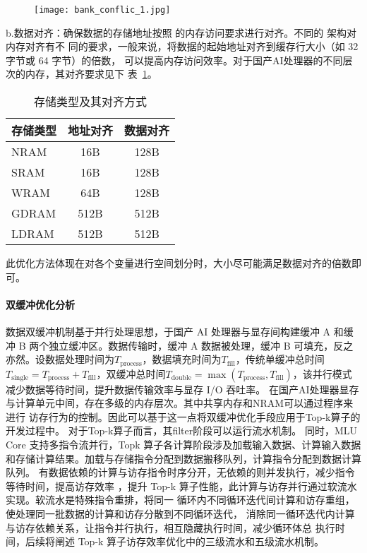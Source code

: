 \begin{figure}[ht]
    \centering
 \texttt{[image: bank\_conflic\_1.jpg]}
    \caption{}
    \label{fig:bank_conflic}
\end{figure}





b.数据对齐：确保数据的存储地址按照 的内存访问要求进行对齐。不同的 架构对内存对齐有不
同的要求，一般来说，将数据的起始地址对齐到缓存行大小（如 32 字节或 64 字节）的倍数，
可以提高内存访问效率。对于国产AI处理器的不同层次的内存，其对齐要求见下
表~\ref{tab:alignment}。

\begin{table}
    \centering
    \begin{tabular}{lcc}
    \toprule
    存储类型 & 地址对齐 & 数据对齐 \\
    \midrule
    NRAM & 16B & 128B \\
    SRAM & 16B & 128B \\
    WRAM & 64B & 128B \\
    GDRAM & 512B & 512B \\
    LDRAM & 512B & 512B \\
    \bottomrule
    \end{tabular}
    \caption{存储类型及其对齐方式}
    \label{tab:alignment}
    \end{table}
此优化方法体现在对各个变量进行空间划分时，大小尽可能满足数据对齐的倍数即可。


\paragraph{双缓冲优化分析}

数据双缓冲机制基于并行处理思想，于国产 AI 处理器与显存间构建缓冲 A 和缓冲 B 两个独立缓冲区。数据传输时，缓冲 A 数据被处理，缓冲 B 可填充，反之亦然。设数据处理时间为\(T_{\text{process}}\)，数据填充时间为\(T_{\text{fill}}\)，传统单缓冲总时间\(T_{\text{single}} = T_{\text{process}} + T_{\text{fill}}\)，双缓冲总时间\(T_{\text{double}}=\max(T_{\text{process}}, T_{\text{fill}})\)，该并行模式减少数据等待时间，提升数据传输效率与显存 I/O 吞吐率。
在国产AI处理器显存与计算单元中间，存在多级的内存层次。其中共享内存和NRAM可以通过程序来进行
访存行为的控制。因此可以基于这一点将双缓冲优化手段应用于Top-k算子的开发过程中。
对于Top-k算子而言，其filter阶段可以运行流水机制。
同时，MLU Core 支持多指令流并行，Topk 算子各计算阶段涉及加载输入数据、计算输入数据
和存储计算结果。加载与存储指令分配到数据搬移队列，计算指令分配到数据计算队列。
有数据依赖的计算与访存指令时序分开，无依赖的则并发执行，减少指令等待时间，提高访存效率
，提升 Top-k 算子性能，此计算与访存并行通过软流水实现。软流水是特殊指令重排，将同一
循环内不同循环迭代间计算和访存重组，使处理同一批数据的计算和访存分散到不同循环迭代，
消除同一循环迭代内计算与访存依赖关系，让指令并行执行，相互隐藏执行时间，减少循环体总
执行时间，后续将阐述 Top-k 算子访存效率优化中的三级流水和五级流水机制。


